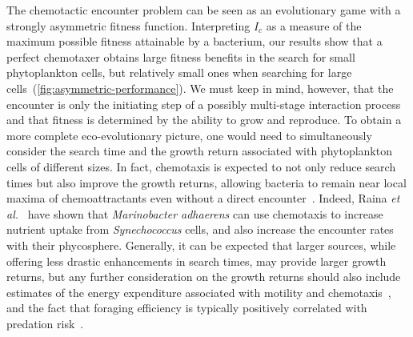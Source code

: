 \documentclass[9pt,twocolumn,twoside]{pnas-new}
\begin{document}
The chemotactic encounter problem can be seen as an evolutionary game with a strongly asymmetric fitness function.
Interpreting $I_c$ as a measure of the maximum possible fitness attainable by a bacterium, our results show that a perfect chemotaxer obtains large fitness benefits in the search for small phytoplankton cells, but relatively small ones when searching for large cells~(\autoref{fig:asymmetric-performance}). 
We must keep in mind, however, that the encounter is only the initiating step of a possibly multi-stage interaction process and that fitness is determined by the ability to grow and reproduce.
To obtain a more complete eco-evolutionary picture, one would need to simultaneously consider the search time and the growth return associated with phytoplankton cells of different sizes.
In fact, chemotaxis is expected to not only reduce search times but also improve the growth returns, allowing bacteria to remain near local maxima of chemoattractants even without a direct encounter~\cite{fernandez2019foraging}.
Indeed, Raina \textit{et al.}~\cite{raina2023chemotaxis} have shown that \textit{Marinobacter adhaerens} can use chemotaxis to increase nutrient uptake from \textit{Synechococcus} cells, and also increase the encounter rates with their phycosphere.
Generally, it can be expected that larger sources, while offering less drastic enhancements in search times, may provide larger growth returns, but any further consideration on the growth returns should also include estimates of the energy expenditure associated with motility and chemotaxis~\cite{malaguti2021theory,keegstra2022ecological}, and the fact that foraging efficiency is typically positively correlated with predation risk~\cite{nielsen2021foraging,ebrahimi2022particle}.
\end{document}
